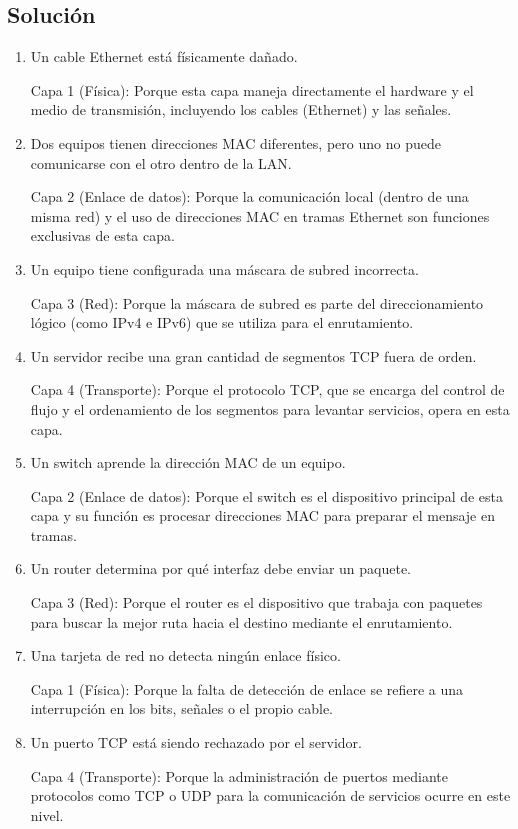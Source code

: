 \subsection*{Solución}
\begin{enumerate}[label=(\alph*), leftmargin=*]
    \item Un cable Ethernet está físicamente dañado.
    
    Capa 1 (Física): Porque esta capa maneja directamente 
    el hardware y el medio de transmisión, incluyendo los cables (Ethernet) y las señales.
    
    \item Dos equipos tienen direcciones MAC diferentes, pero uno no puede comunicarse con el otro dentro de la LAN.
    
    Capa 2 (Enlace de datos): Porque la comunicación local (dentro de una misma red) y 
    el uso de direcciones MAC en tramas Ethernet son funciones exclusivas de esta capa.
    
    \item Un equipo tiene configurada una máscara de subred incorrecta.
    
    Capa 3 (Red): Porque la máscara de subred es parte del direccionamiento lógico 
    (como IPv4 e IPv6) que se utiliza para el enrutamiento.
    
    \item Un servidor recibe una gran cantidad de segmentos TCP fuera de orden.
    
    Capa 4 (Transporte): Porque el protocolo TCP, que se encarga del control de flujo 
    y el ordenamiento de los segmentos para levantar servicios, opera en esta capa.\newpage

    \item Un switch aprende la dirección MAC de un equipo.
    
    Capa 2 (Enlace de datos): Porque el switch es el dispositivo principal de esta capa 
    y su función es procesar direcciones MAC para preparar el mensaje en tramas.
    
    \item Un router determina por qué interfaz debe enviar un paquete.
    
    Capa 3 (Red): Porque el router es el dispositivo que trabaja con paquetes 
    para buscar la mejor ruta hacia el destino mediante el enrutamiento.
    
    \item Una tarjeta de red no detecta ningún enlace físico.
    
    Capa 1 (Física): Porque la falta de detección de enlace se refiere a una 
    interrupción en los bits, señales o el propio cable.
    
    \item Un puerto TCP está siendo rechazado por el servidor.
    
    Capa 4 (Transporte): Porque la administración de puertos mediante 
    protocolos como TCP o UDP para la comunicación de servicios ocurre en este nivel.
\end{enumerate}
